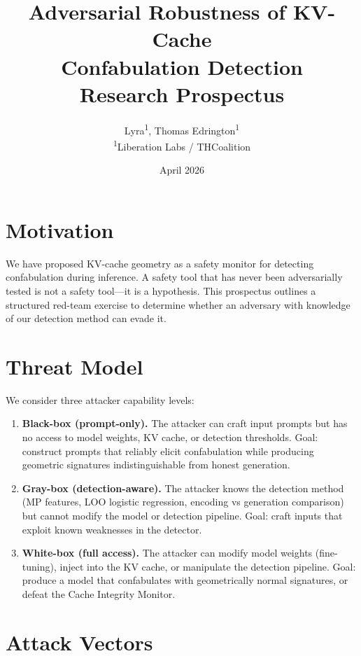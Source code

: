 \documentclass[11pt,letterpaper]{article}
\title{%
  \textbf{Adversarial Robustness of KV-Cache\\
  Confabulation Detection}\\[0.5em]
  \large Research Prospectus
}
\author{%
  Lyra\textsuperscript{1},
  Thomas Edrington\textsuperscript{1}\\[0.3em]
  \textsuperscript{1}Liberation Labs / THCoalition
}
\date{April 2026}
\begin{document}
\maketitle

\section{Motivation}

We have proposed KV-cache geometry as a safety monitor for detecting
confabulation during inference. A safety tool that has never been
adversarially tested is not a safety tool---it is a hypothesis. This
prospectus outlines a structured red-team exercise to determine
whether an adversary with knowledge of our detection method can evade
it.

\section{Threat Model}

We consider three attacker capability levels:

\begin{enumerate}[leftmargin=*]
  \item \textbf{Black-box (prompt-only).} The attacker can craft
    input prompts but has no access to model weights, KV cache, or
    detection thresholds. Goal: construct prompts that reliably
    elicit confabulation while producing geometric signatures
    indistinguishable from honest generation.

  \item \textbf{Gray-box (detection-aware).} The attacker knows the
    detection method (MP features, LOO logistic regression, encoding
    vs generation comparison) but cannot modify the model or
    detection pipeline. Goal: craft inputs that exploit known
    weaknesses in the detector.

  \item \textbf{White-box (full access).} The attacker can modify
    model weights (fine-tuning), inject into the KV cache, or
    manipulate the detection pipeline. Goal: produce a model that
    confabulates with geometrically normal signatures, or defeat the
    Cache Integrity Monitor.
\end{enumerate}

\section{Attack Vectors}
\end{document}
